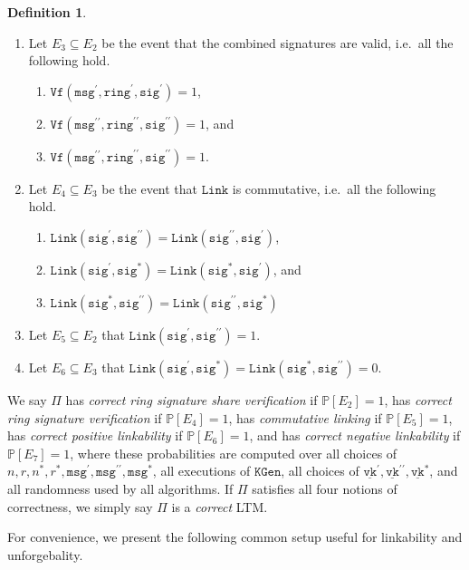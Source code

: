 \documentclass[11pt]{article}
\theoremstyle{definition}
\newtheorem{definition}[definition]{Definition}
\newcommand{\ring}{\texttt{ring}}
\newcommand{\VK}{\underline{\texttt{vk}}}
\newcommand{\sig}{\texttt{sig}}
\newcommand{\msg}{\texttt{msg}}
\newcommand{\keygen}{\texttt{KGen}}
\newcommand{\verify}{\texttt{Vf}}
\newcommand{\link}{\texttt{Link}}
\begin{document}
\begin{definition}
\begin{enumerate}
\item  Let $E_3 \subseteq E_2$ be the event that the combined signatures are valid, i.e.\ all the following hold.
\begin{enumerate}
\item $\verify(\msg^{\prime}, \ring^{\prime}, \sig^\prime) = 1$,
\item $\verify(\msg^{\prime\prime}, \ring^{\prime\prime}, \sig^{\prime\prime}) = 1$, and
\item $\verify(\msg^{\prime\prime}, \ring^{\prime\prime}, \sig^{\prime\prime}) = 1$.
\end{enumerate}

\item Let $E_4 \subseteq E_3$ be the event that $\link$ is commutative, i.e.\ all the following hold.
\begin{enumerate}
\item $\link(\sig^\prime, \sig^{\prime \prime}) = \link(\sig^{\prime \prime}, \sig^\prime)$,
\item $\link(\sig^\prime, \sig^*) = \link(\sig^*, \sig^\prime)$, and
\item $\link(\sig^*, \sig^{\prime \prime}) = \link(\sig^{\prime \prime}, \sig^*)$
\end{enumerate}

\item Let $E_5 \subseteq E_2$ that $\link(\sig^\prime, \sig^{\prime \prime}) = 1$.

\item Let $E_6 \subseteq E_3$ that $\link(\sig^\prime, \sig^*) =  \link(\sig^*, \sig^{\prime \prime})=0$.

\end{enumerate}
We say $\Pi$ has \textit{correct ring signature share verification} if $\mathbb{P}[E_2] = 1$, has \textit{correct ring signature verification} if $\mathbb{P}[E_4] = 1$, has \textit{commutative linking} if $\mathbb{P}[E_5]=1$, has \textit{correct positive linkability} if $\mathbb{P}\left[E_6\right]=1$, and has \textit{correct negative linkability} if $\mathbb{P}\left[E_7\right]=1$, where these probabilities are computed over all choices of $n, r, n^*, r^*, \msg^\prime, \msg^{\prime \prime}, \msg^*$, all executions of $\keygen$, all choices of $\VK^\prime, \VK^{\prime \prime}, \VK^*$, and all randomness used by all algorithms. If $\Pi$ satisfies all four notions of correctness, we simply say $\Pi$ is a \textit{correct} LTM. 
\end{definition}


For convenience, we present the following common setup useful for linkability and unforgebality.
\end{document}
